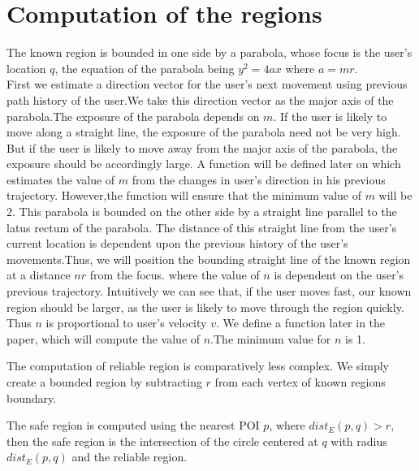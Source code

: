 \section{Computation of the regions}
\label{Comp_reg}
The known region is bounded in one side by a parabola, whose focus is the user's location $q$, the equation of the parabola being $y^2=4ax $ where $ a=mr$.\\
First we estimate a direction vector for the user's next movement using previous path history of the user.We take this direction vector as the major axis of the parabola.The exposure of the parabola depends on $m$. If the user is likely to move along a straight line, the exposure of the parabola need not be very high. But if the user is likely to move away from the major axis of the parabola, the exposure should be accordingly large.  A function will be defined later on which estimates the value of $m$ from the changes in user's direction in his previous trajectory. However,the function will ensure that the minimum value of $m$ will be 2. This parabola is bounded on the other side by a straight line parallel to the latus rectum of the parabola. The distance of this straight line from the user's current location is dependent upon the previous history of the user's movements.Thus, we will position the bounding straight line of the known region at a distance $ nr $ from the focus. where the value of $n$ is dependent on the user's previous trajectory. Intuitively we can see that, if the user moves fast, our known region should be larger, as the user is likely to move through the region quickly. Thus $n$ is proportional to user's velocity $v$. We define a function later in the paper, which will compute the value of $n$.The minimum value for $n$ is 1.

The computation of reliable region is comparatively less complex. We simply create a bounded region by subtracting $r$ from each vertex of known regions boundary. 

The safe region is computed using the nearest POI $p$, where $dist_E(p,q)>r$, then the safe region is the intersection of the circle centered at $q$ with radius $dist_E(p,q)$ and the reliable region.

